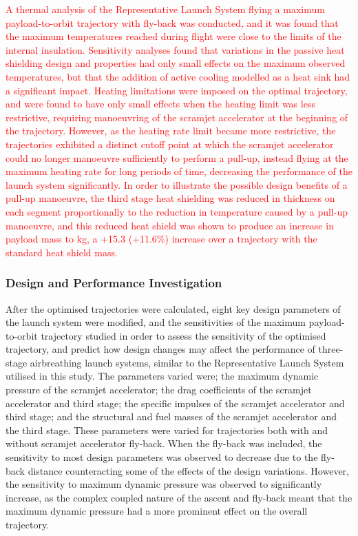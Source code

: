  \textcolor{red}{A thermal analysis of the Representative Launch System flying a maximum payload-to-orbit trajectory with fly-back was conducted, and it was found that the maximum temperatures reached during flight were close to the limits of the internal insulation. Sensitivity analyses found that variations in the passive heat shielding design and properties had only small effects on the maximum observed temperatures, but that the addition of active cooling modelled as a heat sink had a significant impact. 
 	Heating limitations were imposed on the optimal trajectory, and were found to have only small effects when the heating limit was less restrictive, requiring manoeuvring of the scramjet accelerator at the beginning of the trajectory. However, as the heating rate limit became more restrictive, the trajectories exhibited a distinct cutoff point at which the scramjet accelerator could no longer manoeuvre sufficiently to perform a pull-up, instead flying at the maximum heating rate for long periods of time, decreasing the performance of the launch system significantly. 
 	In order to illustrate the possible design benefits of a pull-up manoeuvre, the third stage heat shielding was reduced in thickness on each segment proportionally to the reduction in temperature caused by a pull-up manoeuvre, and this reduced heat shield was shown to produce an increase in payload mass to \PayloadToOrbitTPSreduced kg, a +15.3 (+11.6\%) increase over a trajectory with the standard heat shield mass.}
	
	\subsubsection{Design and Performance Investigation}
After the optimised trajectories were calculated, eight key design parameters of the launch system were modified, and the sensitivities of the maximum payload-to-orbit trajectory studied in order to assess the sensitivity of the optimised trajectory, and predict how design changes may affect the performance of three-stage airbreathing launch systems, similar to the Representative Launch System utilised in this study.
The parameters varied were; the maximum dynamic pressure of the scramjet accelerator; the drag coefficients of the scramjet accelerator and third stage; the specific impulses of the scramjet accelerator and third stage; and the structural and fuel masses of the scramjet accelerator and the third stage. 
These parameters were varied for trajectories both with and without scramjet accelerator fly-back. When the fly-back was included, the sensitivity to most design parameters was observed to decrease due to the fly-back distance counteracting some of the effects of the design variations. However, the sensitivity to maximum dynamic pressure was observed to significantly increase, as the complex coupled nature of the ascent and fly-back meant that the maximum dynamic pressure had a more prominent effect on the overall trajectory. 

